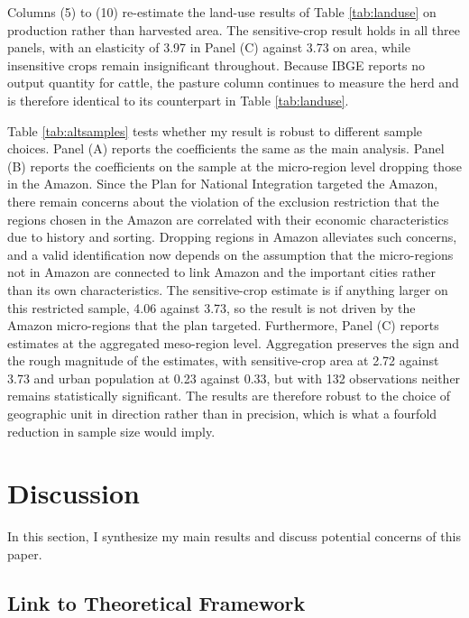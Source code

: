 \documentclass[11pt]{article}
\begin{document}
Columns (5) to (10) re-estimate the land-use results of Table \ref{tab:landuse} on production rather than harvested area. The sensitive-crop result holds in all three panels, with an elasticity of 3.97 in Panel (C) against 3.73 on area, while insensitive crops remain insignificant throughout. Because IBGE reports no output quantity for cattle, the pasture column continues to measure the herd and is therefore identical to its counterpart in Table \ref{tab:landuse}.

Table \ref{tab:altsamples} tests whether my result is robust to different sample choices. Panel (A) reports the coefficients the same as the main analysis. Panel (B) reports the coefficients on the sample at the micro-region level dropping those in the Amazon. Since the Plan for National Integration targeted the Amazon, there remain concerns about the violation of the exclusion restriction that the regions chosen in the Amazon are correlated with their economic characteristics due to history and sorting. Dropping regions in Amazon alleviates such concerns, and a valid identification now depends on the assumption that the micro-regions not in Amazon are connected to link Amazon and the important cities rather than its own characteristics. The sensitive-crop estimate is if anything larger on this restricted sample, 4.06 against 3.73, so the result is not driven by the Amazon micro-regions that the plan targeted. Furthermore, Panel (C) reports estimates at the aggregated meso-region level. Aggregation preserves the sign and the rough magnitude of the estimates, with sensitive-crop area at 2.72 against 3.73 and urban population at 0.23 against 0.33, but with 132 observations neither remains statistically significant. The results are therefore robust to the choice of geographic unit in direction rather than in precision, which is what a fourfold reduction in sample size would imply.

\section{Discussion}

In this section, I synthesize my main results and discuss potential concerns of this paper.

\subsection{Link to Theoretical Framework}
\label{sec:link}
\end{document}
